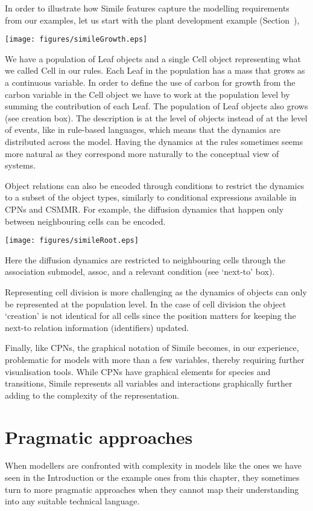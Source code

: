 In order to illustrate how Simile features capture the modelling requirements from our
examples, let us start with the plant development example (Section~),
\begin{center}
  \texttt{[image: figures/simileGrowth.eps]}
\end{center}
We have a population of Leaf objects and a single Cell object representing
what we called $\mathrm{Cell}$ in our rules. Each Leaf in the population has a
mass that grows as a continuous variable. In order to define the use of carbon
for growth from the carbon variable in the Cell object we have to work at the
population level by summing the contribution of each Leaf. The population of
Leaf objects also grows (see creation box). The description is at the level of
objects instead of at the level of events, like in rule-based languages, which
means that the dynamics are distributed across the model. Having the dynamics at
the rules sometimes seems more natural as they correspond more naturally to the
conceptual view of systems.

Object relations can also be encoded through conditions to restrict the dynamics
to a subset of the object types, similarly to conditional expressions available
in CPNs and CSMMR. For example, the diffusion dynamics that happen only between
neighbouring cells can be encoded.
\begin{center}
  \texttt{[image: figures/simileRoot.eps]}
\end{center}
Here the diffusion dynamics are restricted to neighbouring cells through the
association submodel, assoc, and a relevant condition (see `next-to' box).

Representing cell division is more challenging as the dynamics of objects can
only be represented at the population level. In the case of cell division the object
`creation' is not identical for all cells since the position matters for keeping
the next-to relation information (identifiers) updated.

Finally, like CPNs, the graphical notation of Simile becomes, in our experience,
problematic for models with more than a few variables, thereby requiring further
visualisation tools. While CPNs have graphical elements for species and
transitions, Simile represents all variables and interactions graphically
further adding to the complexity of the representation.

\section{Pragmatic approaches}
When modellers are confronted with complexity in models like the ones we have
seen in the Introduction or the example ones from this chapter, they sometimes
turn to more pragmatic approaches when they cannot map their understanding into
any suitable technical language.

